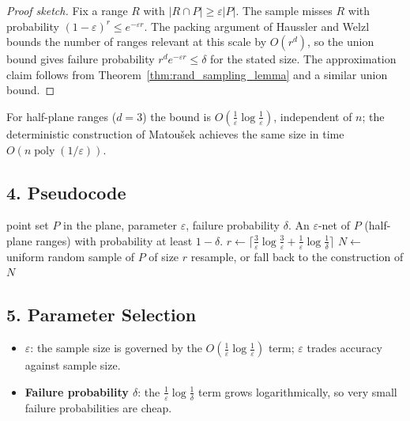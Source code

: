 \begin{proof}[Proof sketch]
  Fix a range $R$ with $|R \cap P| \ge \varepsilon |P|$. The sample misses $R$
  with probability $(1 - \varepsilon)^r \le e^{-\varepsilon r}$. The packing
  argument of Haussler and Welzl bounds the number of ranges relevant at this
  scale by $O(r^d)$, so the union bound gives failure probability
  $r^d e^{-\varepsilon r} \le \delta$ for the stated size. The approximation
  claim follows from Theorem~\ref{thm:rand_sampling_lemma} and a similar union
  bound.
\end{proof}

For half-plane ranges ($d = 3$) the bound is $O(\frac{1}{\varepsilon}
\log\frac{1}{\varepsilon})$, independent of $n$; the deterministic construction
of Matou\v{s}ek \cite{matousek1990} achieves the same size in time
$O(n \operatorname{poly}(1/\varepsilon))$.

\subsection{4. Pseudocode}

\begin{algorithm}[htbp]
\caption{Randomized $\varepsilon$-Net Construction}
\label{alg:rand_eps_net_sampling}
\begin{algorithmic}[1]
\Require point set $P$ in the plane, parameter $\varepsilon$, failure probability $\delta$.
\Ensure An $\varepsilon$-net of $P$ (half-plane ranges) with probability at least $1 - \delta$.
  \State $r \gets \big\lceil \tfrac{3}{\varepsilon}\log\tfrac{3}{\varepsilon} + \tfrac{1}{\varepsilon}\log\tfrac{1}{\delta} \big\rceil$
  \State $N \gets$ uniform random sample of $P$ of size $r$
    \State resample, or fall back to the construction of \cite{matousek1990}
  \EndIf
  \State \Return $N$
\EndFunction
\end{algorithmic}
\end{algorithm}

\subsection{5. Parameter Selection}

\begin{itemize}
\item \textbf{$\varepsilon$}: the sample size is governed by the
  $O(\frac{1}{\varepsilon}\log\frac{1}{\varepsilon})$ term; $\varepsilon$
  trades accuracy against sample size.
\item \textbf{Failure probability $\delta$}: the
  $\frac{1}{\varepsilon}\log\frac{1}{\delta}$ term grows logarithmically, so
  very small failure probabilities are cheap.
\end{itemize}

